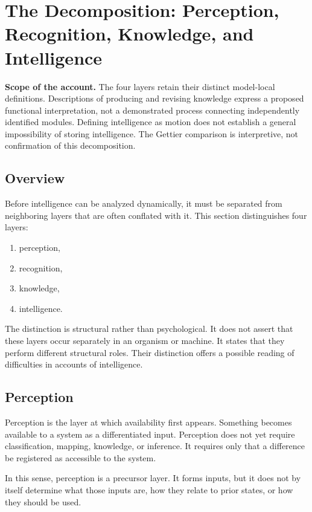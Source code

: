 \section{The Decomposition: Perception, Recognition, Knowledge, and Intelligence}

\noindent\textbf{Scope of the account.} The four layers retain their distinct model-local definitions. Descriptions of producing and revising knowledge express a proposed functional interpretation, not a demonstrated process connecting independently identified modules. Defining intelligence as motion does not establish a general impossibility of storing intelligence. The Gettier comparison is interpretive, not confirmation of this decomposition.


\subsection{Overview}

Before intelligence can be analyzed dynamically, it must be separated from neighboring layers that are often conflated with it. This section distinguishes four layers:

\begin{enumerate}
\item perception,
\item recognition,
\item knowledge,
\item intelligence.
\end{enumerate}

The distinction is structural rather than psychological. It does not assert that these layers occur separately in an organism or machine. It states that they perform different structural roles. Their distinction offers a possible reading of difficulties in accounts of intelligence.

\subsection{Perception}

Perception is the layer at which availability first appears. Something becomes available to a system as a differentiated input. Perception does not yet require classification, mapping, knowledge, or inference. It requires only that a difference be registered as accessible to the system.

In this sense, perception is a precursor layer. It forms inputs, but it does not by itself determine what those inputs are, how they relate to prior states, or how they should be used.


